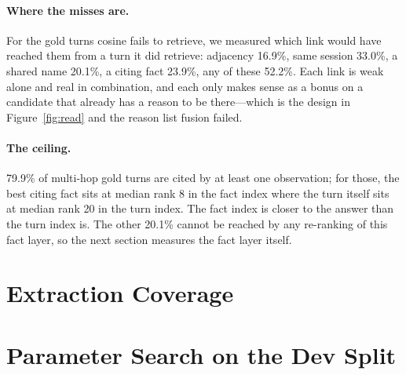 \documentclass[11pt]{article}
\begin{document}
\paragraph{Where the misses are.} For the gold turns cosine fails to
retrieve, we measured which link would have reached them from a turn it did
retrieve: adjacency 16.9\%, same session 33.0\%, a shared name 20.1\%, a
citing fact 23.9\%, any of these 52.2\%. Each link is weak alone and real in
combination, and each only makes sense as a bonus on a candidate that
already has a reason to be there---which is the design in
Figure~\ref{fig:read} and the reason list fusion failed.

\paragraph{The ceiling.} 79.9\% of multi-hop gold turns are cited by at
least one observation; for those, the best citing fact sits at median rank
8 in the fact index where the turn itself sits at median rank 20 in the turn
index. The fact index is closer to the answer than the turn index is. The
other 20.1\% cannot be reached by any re-ranking of this fact layer, so the
next section measures the fact layer itself.

\section{Extraction Coverage}
\label{sec:coverage}

\begin{table}[t]
\centering
\footnotesize

\caption{Fact coverage of LoCoMo gold turns. A gold turn is covered when at
least one extracted fact cites it; covered with the right entity when that
fact's canonical subject or object is the entity the question names;
covered with a dated fact when the fact carries an event time. Precision is
read on a hand-checked sample of 100 facts.}
\label{tab:coverage}
\end{table}

\section{Parameter Search on the Dev Split}
\label{sec:sweep}

\begin{table}[t]
\centering
\footnotesize

\caption{Every parameter searched, the range, the value chosen on dev, and
the test number read once after the freeze. The full grid is in
\texttt{ablations/}.}
\label{tab:sweep}
\end{table}
\end{document}
